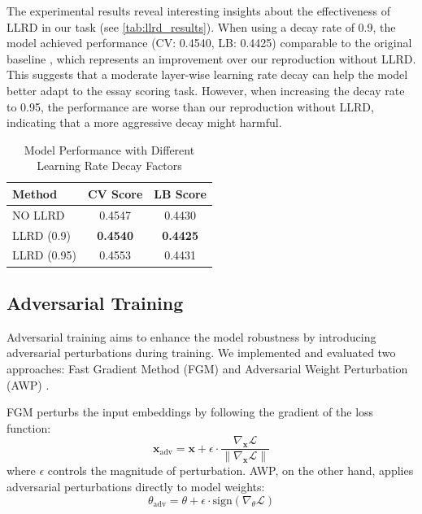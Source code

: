 \documentclass[12pt]{article}
\begin{document}
The experimental results reveal interesting insights about the effectiveness of LLRD in our task (see \autoref{tab:llrd_results}). When using a decay rate of 0.9, the model achieved performance (CV: 0.4540, LB: 0.4425) comparable to the original baseline , which represents an improvement over our reproduction without LLRD. This suggests that a moderate layer-wise learning rate decay can help the model better adapt to the essay scoring task. However, when increasing the decay rate to 0.95, the performance are worse than our reproduction without LLRD, indicating that a more aggressive decay might harmful. 

\begin{table}[H]
\centering
\caption{Model Performance with Different Learning Rate Decay Factors}
\label{tab:llrd_results}
\begin{tabular}{lcc}
\hline
\textbf{Method} & \textbf{CV Score} & \textbf{LB Score} \\
\hline
NO LLRD & 0.4547 & 0.4430 \\
LLRD (0.9) & \textbf{0.4540} & \textbf{0.4425} \\
LLRD (0.95) & 0.4553 & 0.4431 \\
\hline
\end{tabular}
\end{table}


\subsection{Adversarial Training}
Adversarial training aims to enhance the model robustness by introducing adversarial perturbations during training. We implemented and evaluated two approaches: Fast Gradient Method (FGM) \cite{miyato2016adversarial} and Adversarial Weight Perturbation (AWP) \cite{wu2020adversarial}. 

FGM perturbs the input embeddings by following the gradient of the loss function:
\begin{equation}
    \boldsymbol{x}_{\text{adv}} = \boldsymbol{x} + \epsilon \cdot \frac{\nabla_{\boldsymbol{x}} \mathcal{L}}{\|\nabla_{\boldsymbol{x}} \mathcal{L}\|}
\end{equation}
where $\epsilon$ controls the magnitude of perturbation. AWP, on the other hand, applies adversarial perturbations directly to model weights:
\begin{equation}
    \theta_{\text{adv}} = \theta + \epsilon \cdot \text{sign}\left( \nabla_{\theta} \mathcal{L} \right)
\end{equation}
\end{document}

